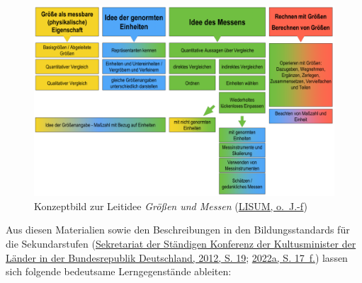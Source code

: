 \documentclass[
]{scrbook}
\theoremstyle{definition}
\theoremstyle{definition}
\theoremstyle{definition}
\theoremstyle{definition}
\theoremstyle{remark}
\begin{document}
\begin{figure}

{\centering \includegraphics[width=1\linewidth]{pictures/11-KonzeptMessen} 

}

\caption{Konzeptbild zur Leitidee \emph{Größen und Messen} (\protect\hyperlink{ref-LISUMf}{LISUM, o.~J.-f})}\label{fig:KonzeptMessen}
\end{figure}

Aus diesen Materialien sowie den Beschreibungen in den Bildungsstandards für die Sekundarstufen (\protect\hyperlink{ref-KMK:2012}{Sekretariat der Ständigen Konferenz der Kultusminister der Länder in der Bundesrepublik Deutschland, 2012, S. 19}; \protect\hyperlink{ref-SekretariatderStandigenKonferenzderKultusministerderLanderinderBundesrepublikDeutschland2022}{2022a, S. 17~f.}) lassen sich folgende bedeutsame Lerngegenstände ableiten:
\end{document}
